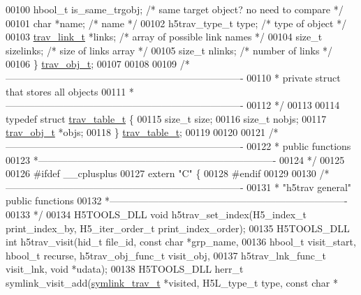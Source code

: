 \begin{DoxyCode}
00100     hbool\_t     is\_same\_trgobj; \textcolor{comment}{/* same target object? no need to compare */}
00101     \textcolor{keywordtype}{char}        *name;     \textcolor{comment}{/* name */}
00102     h5trav\_type\_t type;    \textcolor{comment}{/* type of object */}
00103     \hyperlink{structtrav__link__t}{trav\_link\_t} *links;    \textcolor{comment}{/* array of possible link names */}
00104     \textcolor{keywordtype}{size\_t}      sizelinks; \textcolor{comment}{/* size of links array */}
00105     \textcolor{keywordtype}{size\_t}      nlinks;    \textcolor{comment}{/* number of links */}
00106 \} \hyperlink{structtrav__obj__t}{trav\_obj\_t};
00107 
00108 
00109 \textcolor{comment}{/*-------------------------------------------------------------------------}
00110 \textcolor{comment}{ * private struct that stores all objects}
00111 \textcolor{comment}{ *-------------------------------------------------------------------------}
00112 \textcolor{comment}{ */}
00113 
00114 \textcolor{keyword}{typedef} \textcolor{keyword}{struct }\hyperlink{structtrav__table__t}{trav\_table\_t} \{
00115     \textcolor{keywordtype}{size\_t}      size;
00116     \textcolor{keywordtype}{size\_t}      nobjs;
00117     \hyperlink{structtrav__obj__t}{trav\_obj\_t} *objs;
00118 \} \hyperlink{structtrav__table__t}{trav\_table\_t};
00119 
00120 
00121 \textcolor{comment}{/*-------------------------------------------------------------------------}
00122 \textcolor{comment}{ * public functions}
00123 \textcolor{comment}{ *-------------------------------------------------------------------------}
00124 \textcolor{comment}{ */}
00125 
00126 \textcolor{preprocessor}{#ifdef \_\_cplusplus}
00127 \textcolor{keyword}{extern} \textcolor{stringliteral}{"C"} \{
00128 \textcolor{preprocessor}{#endif}
00129 
00130 \textcolor{comment}{/*-------------------------------------------------------------------------}
00131 \textcolor{comment}{ * "h5trav general" public functions}
00132 \textcolor{comment}{ *-------------------------------------------------------------------------}
00133 \textcolor{comment}{ */}
00134 H5TOOLS\_DLL \textcolor{keywordtype}{void} h5trav\_set\_index(H5\_index\_t print\_index\_by, H5\_iter\_order\_t print\_index\_order);
00135 H5TOOLS\_DLL \textcolor{keywordtype}{int} h5trav\_visit(hid\_t file\_id, \textcolor{keyword}{const} \textcolor{keywordtype}{char} *grp\_name, 
00136     hbool\_t visit\_start, hbool\_t recurse, h5trav\_obj\_func\_t visit\_obj, 
00137     h5trav\_lnk\_func\_t visit\_lnk, \textcolor{keywordtype}{void} *udata);
00138 H5TOOLS\_DLL herr\_t symlink\_visit\_add(\hyperlink{structsymlink__trav__t}{symlink\_trav\_t} *visited, H5L\_type\_t type, \textcolor{keyword}{const} \textcolor{keywordtype}{char} *

\end{DoxyCode}
